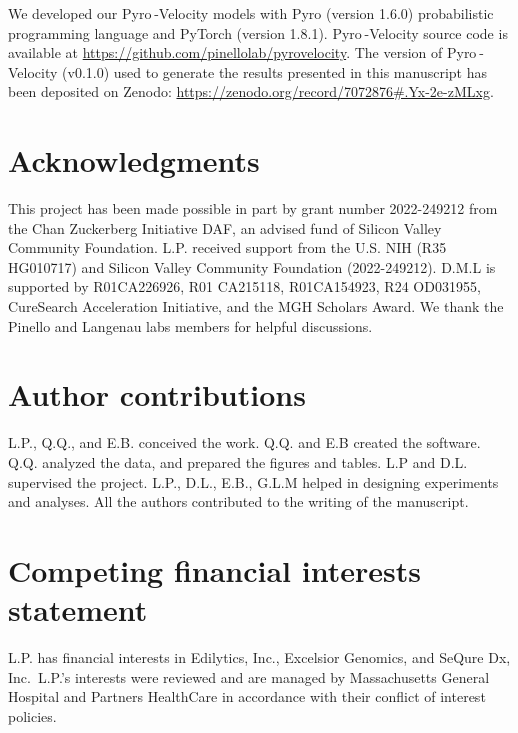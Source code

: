 \documentclass[
  sn-mathphys-num,
  lineno,
  twocolumn]{sn-jnl}
\begin{document}
We developed our Pyro -Velocity models with Pyro (version 1.6.0)
probabilistic programming language and PyTorch (version 1.8.1).
Pyro -Velocity source code is available at
\url{https://github.com/pinellolab/pyrovelocity}. The version of
Pyro -Velocity (v0.1.0) used to generate the results presented in this
manuscript has been deposited on Zenodo:
\url{https://zenodo.org/record/7072876\#.Yx-2e-zMLxg}.

\section*{Acknowledgments}\label{acknowledgments}

This project has been made possible in part by grant number 2022-249212
from the Chan Zuckerberg Initiative DAF, an advised fund of Silicon
Valley Community Foundation. L.P. received support from the U.S. NIH
(R35 HG010717) and Silicon Valley Community Foundation (2022-249212).
D.M.L is supported by R01CA226926, R01 CA215118, R01CA154923, R24
OD031955, CureSearch Acceleration Initiative, and the MGH Scholars
Award. We thank the Pinello and Langenau labs members for helpful
discussions.

\section*{Author contributions}\label{author-contributions}

L.P., Q.Q., and E.B. conceived the work. Q.Q. and E.B created the
software. Q.Q. analyzed the data, and prepared the figures and tables.
L.P and D.L. supervised the project. L.P., D.L., E.B., G.L.M helped in
designing experiments and analyses. All the authors contributed to the
writing of the manuscript.

\section*{Competing financial interests
statement}\label{competing-financial-interests-statement}

L.P. has financial interests in Edilytics, Inc., Excelsior Genomics, and
SeQure Dx, Inc.~L.P.'s interests were reviewed and are managed by
Massachusetts General Hospital and Partners HealthCare in accordance
with their conflict of interest policies.

\FloatBarrier
\clearpage
\end{document}

